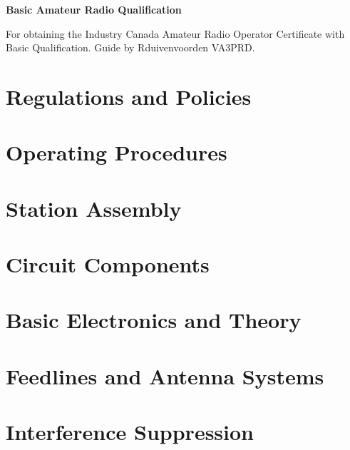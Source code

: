 \documentclass[12pt,letterpaper,fleqn,oneside]{article}
\begin{document}
\LARGE{\textbf{Basic Amateur Radio Qualification}}

\normalsize For obtaining the Industry Canada Amateur Radio Operator Certificate with Basic Qualification. Guide by Rduivenvoorden VA3PRD.


\section{Regulations and Policies}

\section{Operating Procedures}

\section{Station Assembly}

\section{Circuit Components}

\section{Basic Electronics and Theory}

\section{Feedlines and Antenna Systems}



\section{Interference Suppression}
\end{document}
